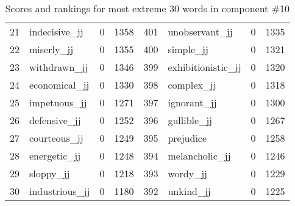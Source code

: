 \begin{table}[tbp]
\begin{tabular}{| rlr@{.}l | rlr@{.}l |}
    21 & indecisive\_jj & 0 & 1358    &    401 & unobservant\_jj & 0 & 1335 \\
    22 & miserly\_jj & 0 & 1355    &    400 & simple\_jj & 0 & 1321 \\
    23 & withdrawn\_jj & 0 & 1346    &    399 & exhibitionistic\_jj & 0 & 1320 \\
    24 & economical\_jj & 0 & 1330    &    398 & complex\_jj & 0 & 1318 \\
    25 & impetuous\_jj & 0 & 1271    &    397 & ignorant\_jj & 0 & 1300 \\
    26 & defensive\_jj & 0 & 1252    &    396 & gullible\_jj & 0 & 1267 \\
    27 & courteous\_jj & 0 & 1249    &    395 & prejudice & 0 & 1258 \\
    28 & energetic\_jj & 0 & 1248    &    394 & melancholic\_jj & 0 & 1246 \\
    29 & sloppy\_jj & 0 & 1218    &    393 & wordy\_jj & 0 & 1229 \\
    30 & industrious\_jj & 0 & 1180    &    392 & unkind\_jj & 0 & 1225 \\
    \hline
    \end{tabular}
    \caption{Scores and rankings for most extreme 30 words in component \#10} 
\end{table}
\clearpage

